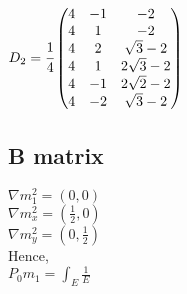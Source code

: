 \documentclass{article}
\begin{document}
$D_2 = \cfrac{1}{4}\begin{pmatrix}
    4 & -1 & - 2\\
    4 & 1 & - 2\\
    4 & 2 & \sqrt{3} - 2\\
    4 & 1 & 2\sqrt{3} - 2\\
    4 & -1 & 2\sqrt{2} - 2\\
    4 & -2 & \sqrt{3} - 2\\
\end{pmatrix}$

\subsection{B matrix}
$\nabla m_1^2 = (0,0)$\\
$\nabla m_x^2 = (\frac{1}{2},0)$ \\
$\nabla m_y^2 = (0,\frac{1}{2})$ \\

Hence, \\
$P_0m_1 = \int_E\frac{1}{E}$
\end{document}
